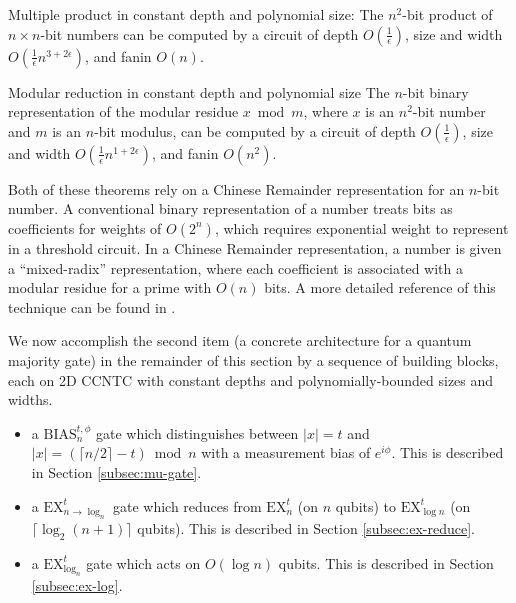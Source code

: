 \begin{theorem}{Multiple product in constant depth and polynomial size: \cite{Yeh1996}}
The $n^2$-bit product of $n\times n$-bit numbers can be computed by a
circuit of depth $O(\frac{1}{\epsilon})$,
size and width $O(\frac{1}{\epsilon}n^{3+2\epsilon})$, and
fanin $O(n)$.
\end{theorem}

\begin{theorem}{Modular reduction in constant depth and polynomial size \cite{Yeh1996}}
The $n$-bit binary representation of the modular residue $x \bmod m$, where
$x$ is an $n^2$-bit number and $m$ is an $n$-bit modulus, can be computed
by a circuit of depth $O(\frac{1}{\epsilon})$,
size and width $O(\frac{1}{\epsilon}n^{1 + 2\epsilon})$, and
fanin $O(n^2)$.
\end{theorem}

Both of these theorems rely on a Chinese Remainder representation for
an $n$-bit number. A conventional binary representation of a number
treats bits as coefficients for weights of $O(2^n)$, which requires exponential
weight to represent in a threshold circuit. In a Chinese Remainder representation,
a number is given a ``mixed-radix'' representation, where each coefficient
is associated with a modular residue for a prime with $O(n)$ bits.
A more detailed reference of this technique can be found in \cite{Reif1992}.

We now accomplish the second item (a concrete architecture for a quantum majority gate)
in the remainder of this section by a sequence of building blocks, each on 2D
CCNTC with constant depths and polynomially-bounded sizes and widths.

\begin{itemize}

\item a $\text{BIAS}^{t,\phi}_n$ gate which distinguishes between $|x| = t$ and $|x| = (\lceil n/2 \rceil - t) \bmod n$ with a measurement bias of $e^{i\phi}$.
This is described in Section \ref{subsec:mu-gate}.
\item a $\text{EX}^t_{n\rightarrow \log_n}$ gate which reduces from $\text{EX}^t_n$ (on $n$ qubits)
to $\text{EX}^t_{\log n}$ (on $\lceil \log_2(n+1) \rceil$ qubits).
This is described in Section \ref{subsec:ex-reduce}.
\item a $\text{EX}^t_{\log_n}$ gate which acts on $O(\log n)$ qubits.
This is described in Section \ref{subsec:ex-log}.
\end{itemize}


